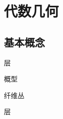 \chapter{代数几何}
\section{基本概念}

\begin{definition}{层}{}
	
\end{definition}

\begin{definition}{概型}{}
	
\end{definition}

\begin{definition}{纤维丛}{}
	
\end{definition}

\begin{definition}{层}{}
	
\end{definition}
